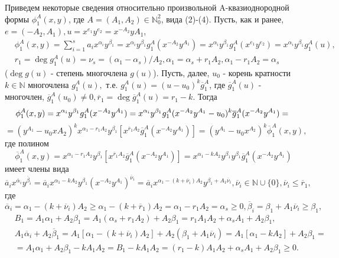 \documentclass[11pt,reqno]{amsart}
\theoremstyle{plain}
\theoremstyle{definition}
\begin{document}
Приведем некоторые сведения относительно произвольной A-квазиоднородной формы $\phi^A_1(x,y)$, где $A=(A_1,A_2) \in \mathbb{N}^2_0$, вида (2)-(4). Пусть, как и ранее, $e = (-A_2, A_1), u = x^{e_1}y^{e_2} = x^{-A_2}y{A_1}$,
\begin{align*}
    &\phi^A_1(x,y) = \displaystyle\sum_{i=1}^{s} a_i x^{\alpha_i}y^{\beta_1} = x^{\alpha_i}y^{\beta_1}g^A_1(x^{-A_2}y^{A_1}) = x^{\alpha_i}y^{\beta_1}g^A_1(x^{e_1}y^{e_2}) =  x^{\alpha_i}y^{\beta_1}g^A_1(u),\\
    &r_1 = \deg g^A_1(u) = \nu_s = (\alpha_1 - \alpha_s) / A_2, \alpha_1 = \alpha_s + r_1 A_2, \alpha_1 - r_1 A_2 = \alpha_s
\end{align*}
($\deg g(u)$ - степень многочлена $g(u)$). Пусть, далее, $u_0$ - корень кратности $k \in \mathbb{N}$ многочлена $g^A_1(u),$ т.е. $g^A_1(u) = (u - u_0)^k\overline{g}^A_1$, где $\overline{g}^A_1(u)$ - многочлен, $\overline{g}^A_1(u_0) \ne 0, \overline{r}_1 = \deg \overline{g}^A_1(u) = r_1 - k$. Тогда
$$
\phi^A_1(x,y) = x^{\alpha_i}y^{\beta_1}g^A_1(x^{-A_2}y^{A_1}) = x^{\alpha_i}y^{\beta_1}g^A_1(x^{-A_2}y^{A_1} - u_0)^k\overline{g}^A_1(x^{-A_2}y^{A_1} ) =\\
$$
\begin{equation}\label{nef:eq:27}
=(y^{A_1} - u_0x{A_2})^k x^{\alpha_1-r_1A_2}y^{\beta_1}\left[ x^{\overline{r}_1 A_2} \overline{g}^A_1 (x^{-A_2} y^{A_1})\right] = (y^{A_1} - u_0x^{A_2})^k \overline{\phi}^A_1(x,y),
\end{equation}
где полином
\begin{equation}\label{nef:eq:28}
\overline{\phi}^A_1(x,y) = x^{\alpha_1-r_1A_2}y^{\beta_1}\left[ x^{\overline{r}_1A_2}\overline{g}^A_1(x^{-A_2}y^{A_1}) \right] = x^{\alpha_1-kA_2}y^{\beta_1}y^{\beta_1}\overline{g}^A_1(x^{-A_2}y^{A_1})
\end{equation}
имеет члены вида $\overline{a}_i x^{\overline{\alpha}_i}y^{\overline{\beta}_i} = \overline{a}_i x^{\alpha_1 - k A_2}y^{\beta_1}(x^{-A_2}y^{A_1})^{\overline{\nu}_i} = \overline{a}_i x^{\alpha_1 - (k+\overline{\nu}_i) A_2}y^{\beta_1 + A_1 \overline{\nu}_i}, \overline{\nu}_i \in \mathbb{N} \cup \{0\}, \overline{\nu}_i \leq \overline{r}_1,$ где $\overline{\alpha}_i = \alpha_1 - (k + \overline{\nu}_i)A_2 \geq \alpha_1 - (k + \overline{r}_1)A_2 = \alpha_1 - r_1A_2 = \alpha_s \geq 0, \overline{\beta}_i = \beta_1 + A_1 \overline{\nu}_i \geq \beta_1,$
\begin{align*}
    &B_1 = A_1\alpha_1 + A_2\beta_1 = A_1(\alpha_s + r_1A_2) + A_2\beta_1 = r_1A_1A_2 + \alpha_sA_1 + A_2\beta_1,\\
    &A_1\overline{\alpha}_i + A_2\overline{\beta}_1 = A_1\left[\alpha_1 - (k + \overline{\nu}_i)A_2\right] + A_2(\beta_1 + A_1\overline{\nu}_i) = A_1 \left[ \alpha_1 - kA_2 \right] + A_2\beta_1 = \\
    & = A_1\alpha_1 + A_2\beta_1 - kA_1A_2 = B_1 - kA_1A_2 = (r_1 - k)A_1A_2 + \alpha_sA_1+A_2\beta_1 \geq 0.
\end{align*}
\end{document}
